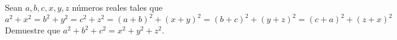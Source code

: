 Sean $a,b,c,x,y,z$ números reales tales que
\[ a^2 + x^2 = b^2 + y^2 = c^2 + z^2 = (a+b)^2 + (x+y)^2 = (b+c)^2 + (y+z)^2 = (c+a)^2 + (z+x)^2 \]
Demuestre que $a^2 + b^2 + c^2 = x^2 + y^2 + z^2$.
